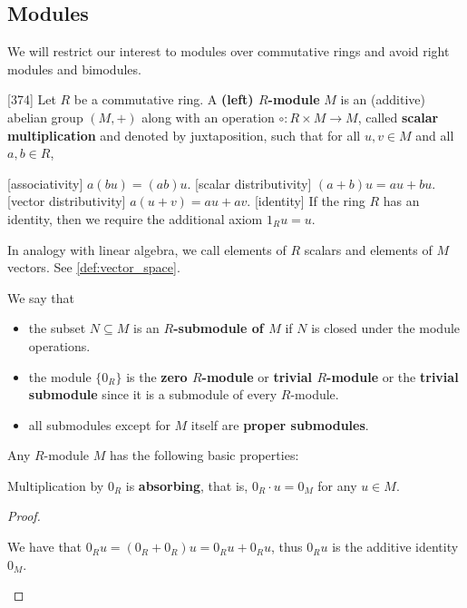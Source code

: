 \subsection{Modules}\label{subsec:modules}

\begin{remark}\label{remark:module_over_commutative_ring}
  We will restrict our interest to modules over commutative rings and avoid right modules and bimodules.
\end{remark}

\begin{definition}\label{def:module}\cite{Knapp2016BAlg}[374]
  Let \( R \) be a commutative ring. A \textbf{(left) \( R \)-module} \( M \) is an (additive) abelian group \( (M, +) \) along with an operation \( \circ: R \times M \to M \), called \textbf{scalar multiplication} and denoted by juxtaposition, such that for all \( u, v \in M \) and all \( a, b \in R \),
  \begin{description}
    [associativity] \( a (b u) = (a b) u \).
    [scalar distributivity] \( (a + b) u = a u + b u \).
    [vector distributivity] \( a (u + v) = a u + a v \).
    [identity] If the ring \( R \) has an identity, then we require the additional axiom \( 1_R u = u \).
  \end{description}

  In analogy with linear algebra, we call elements of \( R \) scalars and elements of \( M \) vectors. See \cref{def:vector_space}.

  We say that
  \begin{itemize}
    \item the subset \( N \subseteq M \) is an \textbf{\( R \)-submodule of \( M \)} if \( N \) is closed under the module operations.
    \item the module \( \{ 0_R \} \) is the \textbf{zero \( R \)-module} or \textbf{trivial \( R \)-module} or the \textbf{trivial submodule} since it is a submodule of every \( R \)-module.
    \item all submodules except for \( M \) itself are \textbf{proper submodules}.
  \end{itemize}
\end{definition}

\begin{proposition}\label{def:module_properties}
  Any \( R \)-module \( M \) has the following basic properties:
  \begin{defenum}
     Multiplication by \( 0_R \) is \textbf{absorbing}, that is, \( 0_R \cdot u = 0_M \) for any \( u \in M \).
  \end{defenum}
\end{proposition}
\begin{proof}\mbox{}
  \begin{itemize}
     We have that \( 0_R u = (0_R + 0_R)u = 0_R u + 0_R u \), thus \( 0_R u \) is the additive identity \( 0_M \).
  \end{itemize}
\end{proof}

